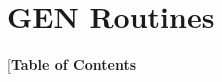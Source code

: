 \begin{comment}
\documentclass[10pt]{article}
\usepackage{fullpage, graphicx, url}
\setlength{\parskip}{1ex}
\setlength{\parindent}{0ex}
\title{GEN Routines}



\begin{tabular}{ccc}
The Alternative Csound Reference Manual & & \\
Previous &Score Statements and GEN Routines &Next

\end{tabular}

\end{comment}
\section{GEN Routines}
\begin{description}
\item[\textbf{Table of Contents}

\end{description}
